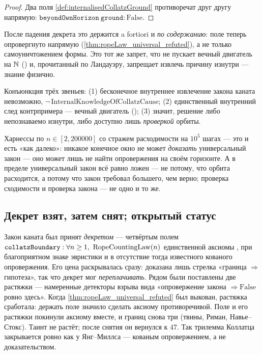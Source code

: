 \begin{proof}
Два поля \cref{def:internalisedCollatzGround} противоречат друг другу напрямую:
$\texttt{beyondOwnHorizon}\ \texttt{ground}:\mathrm{False}$.
\end{proof}

После падения декрета это держится a fortiori и \emph{по содержанию}: поле  теперь
опровергнуто напрямую (\cref{thm:ropeLaw_universal_refuted}), а не только самоуничтожением формы. Это
тот же запрет, что не пускает вечный двигатель на $\mathbb{N}$ () и, прочитанный по
Ландауэру, запрещает извлечь причину изнутри --- знание физично.

\begin{theorem}\label{thm:collatz_verification_not_derivation}
Конъюнкция трёх звеньев: (1) бесконечное внутреннее извлечение закона каната невозможно,
$\neg\,\mathrm{InternalKnowledgeOfCollatzCause}$; (2) единственный внутренний след контрпримера ---
вечный двигатель (); (3) значит, решение либо непознаваемо
изнутри, либо доступно лишь \emph{проверкой} орбиты. \green{}
\end{theorem}

Харнессы по $n\in[2,200000]$ со стражем расходимости на $10^5$ шагах --- это и есть «как далеко»:
никакое конечное окно не может \emph{доказать} универсальный закон --- оно может лишь не найти
опровержения на своём горизонте. А в пределе универсальный закон всё равно ложен --- не потому, что
орбита расходится, а потому что закон требовал большего, чем верно; проверка сходимости и проверка
закона --- не одно и то же.

\subsection{Декрет взят, затем снят; открытый статус}

Закон каната был принят \emph{декретом} --- четвёртым полем
$\code{collatzBoundary}:\forall n\ge 1,\ \mathrm{RopeCountingLaw}(n)$ единственной аксиомы \axiom{}, при
благоприятном знаке эвристики и в отсутствие тогда известного кованого опровержения. Его цена
раскрывалась сразу: доказана лишь стрелка «граница $\Rightarrow$ гипотеза», так что декрет мог
\emph{переплачивать}. Рядом были поставлены две растяжки --- намеренные детекторы взрыва вида
«опровержение закона $\Rightarrow \mathrm{False}$ ровно здесь». Когда \cref{thm:ropeLaw_universal_refuted}
был выкован, растяжка сработала: держать поле значило сделать аксиому противоречивой. Поле и его
растяжки покинули аксиому вместе, и границ снова три (твины, Риман, Навье--Стокс). Таинт не растёт;
после снятия он вернулся к $47$. Так трилемма Коллатца закрывается ровно как у Янг--Миллса --- кованым
опровержением, а не доказательством.

